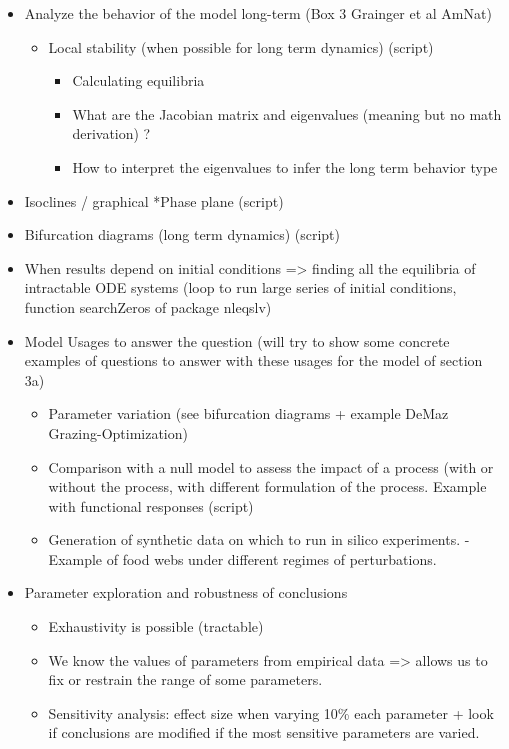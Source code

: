 \documentclass[
]{book}
\providecommand{\tightlist}{%
  \setlength{\itemsep}{0pt}\setlength{\parskip}{0pt}}
\theoremstyle{definition}
\theoremstyle{definition}
\theoremstyle{definition}
\theoremstyle{definition}
\theoremstyle{remark}
\begin{document}
\begin{itemize}
\item
  Analyze the behavior of the model long-term (Box 3 Grainger et al AmNat)

  \begin{itemize}
  \tightlist
  \item
    Local stability (when possible for long term dynamics) (script)

    \begin{itemize}
    \tightlist
    \item
      Calculating equilibria
    \item
      What are the Jacobian matrix and eigenvalues (meaning but no math derivation) ?
    \item
      How to interpret the eigenvalues to infer the long term behavior type
    \end{itemize}
  \end{itemize}
\item
  Isoclines / graphical
  *Phase plane (script)
\item
  Bifurcation diagrams (long term dynamics) (script)
\item
  When results depend on initial conditions =\textgreater{} finding all the equilibria of intractable ODE systems (loop to run large series of initial conditions, function searchZeros of package nleqslv)
\item
  Model Usages to answer the question (will try to show some concrete examples of questions to answer with these usages for the model of section 3a)

  \begin{itemize}
  \tightlist
  \item
    Parameter variation (see bifurcation diagrams + example DeMaz Grazing-Optimization)
  \item
    Comparison with a null model to assess the impact of a process (with or without the process, with different formulation of the process. Example with functional responses (script)
  \item
    Generation of synthetic data on which to run in silico experiments. - Example of food webs under different regimes of perturbations.
  \end{itemize}
\item
  Parameter exploration and robustness of conclusions

  \begin{itemize}
  \tightlist
  \item
    Exhaustivity is possible (tractable)
  \item
    We know the values of parameters from empirical data =\textgreater{} allows us to fix or restrain the range of some parameters.
  \item
    Sensitivity analysis: effect size when varying 10\% each parameter + look if conclusions are modified if the most sensitive parameters are varied.
  \end{itemize}
\end{itemize}

  
\end{document}
